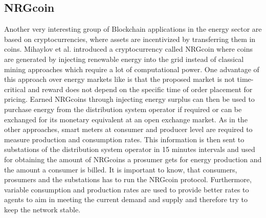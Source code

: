 \documentclass[runningheads]{llncs}
\begin{document}
\subsection{NRGcoin}
Another very interesting group of Blockchain applications in the energy sector are based on cryptocurrencies, where assets are incentivized by transferring them in coins.
Mihaylov et al. \cite{mihaylov_nrgcoin} introduced a cryptocurrency called NRGcoin where coins are generated by injecting renewable energy into the grid instead of classical mining approaches which require a lot of computational power. One advantage of this approach over energy markets like \cite{mengelkamp_lem} \cite{ilic_smart_grid_neighbourhoods} is that the proposed market is not time-critical and reward does not depend on the specific time of order placement for pricing. 
Earned NRGcoins through injecting energy surplus can then be used to purchase energy from the distribution system operator if required or can be exchanged for its monetary equivalent at an open exchange market. \newline
As in the other approaches, smart meters at consumer and producer level are required to measure production and consumption rates. This information is then sent to substations of the distribution system operator in 15 minutes intervals and used for obtaining the amount of NRGcoins a prosumer gets for energy production and the amount a consumer is billed.
It is important to know, that consumers, prosumers and the substations has to run the NRGcoin protocol. Furthermore, variable consumption and production rates are used to provide better rates to agents to aim in meeting the current demand and supply and therefore try to keep the network stable. \cite{mihaylov_nrgcoin}
\end{document}
